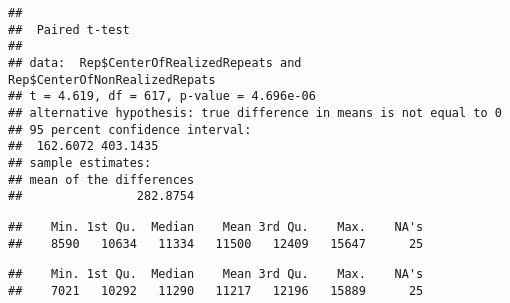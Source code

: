 \documentclass[]{article}
\newenvironment{Shaded}{\begin{snugshade}}{\end{snugshade}}
\newcommand{\CommentTok}[1]{\textcolor[rgb]{0.56,0.35,0.01}{\textit{#1}}}
\newcommand{\DataTypeTok}[1]{\textcolor[rgb]{0.13,0.29,0.53}{#1}}
\newcommand{\KeywordTok}[1]{\textcolor[rgb]{0.13,0.29,0.53}{\textbf{#1}}}
\newcommand{\NormalTok}[1]{#1}
\newcommand{\OperatorTok}[1]{\textcolor[rgb]{0.81,0.36,0.00}{\textbf{#1}}}
\newcommand{\OtherTok}[1]{\textcolor[rgb]{0.56,0.35,0.01}{#1}}
\newcommand{\StringTok}[1]{\textcolor[rgb]{0.31,0.60,0.02}{#1}}
\begin{document}
\begin{Shaded}
\end{Shaded}

\begin{verbatim}
## 
##  Paired t-test
## 
## data:  Rep$CenterOfRealizedRepeats and Rep$CenterOfNonRealizedRepats
## t = 4.619, df = 617, p-value = 4.696e-06
## alternative hypothesis: true difference in means is not equal to 0
## 95 percent confidence interval:
##  162.6072 403.1435
## sample estimates:
## mean of the differences 
##                282.8754
\end{verbatim}

\begin{Shaded}
\end{Shaded}

\begin{verbatim}
##    Min. 1st Qu.  Median    Mean 3rd Qu.    Max.    NA's 
##    8590   10634   11334   11500   12409   15647      25
\end{verbatim}

\begin{Shaded}
\end{Shaded}

\begin{verbatim}
##    Min. 1st Qu.  Median    Mean 3rd Qu.    Max.    NA's 
##    7021   10292   11290   11217   12196   15889      25
\end{verbatim}

\begin{Shaded}
\end{Shaded}
\end{document}
